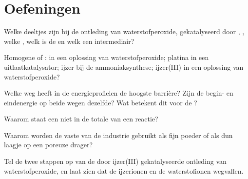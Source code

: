 \section{Oefeningen}


\begin{exercise}[$\star$]\label{exo:g12:catalysis:1}
Welke deeltjes zijn bij de ontleding van waterstofperoxide, gekatalyseerd
door , , welke , welk is de
 en welk een intermediair?
\end{exercise}

\begin{exercise}[$\star$]\label{exo:g12:catalysis:2}
Homogene of :  in een oplossing van
waterstofperoxide; platina in een uitlaatkatalysator; ijzer bij de
ammoniaksynthese; ijzer(III) in een oplossing van waterstofperoxide?
\end{exercise}

\begin{exercise}[$\star$]\label{exo:g12:catalysis:3}
Welke weg heeft in de energieprofielen de hoogste barrière? Zijn de
begin- en eindenergie op beide wegen dezelfde? Wat betekent dit voor de
?
\end{exercise}

\begin{exercise}[$\star$]\label{exo:g12:catalysis:4}
Waarom staat een  niet in de totale  van een
reactie?
\end{exercise}

\begin{exercise}[$\star$]\label{exo:g12:catalysis:5}
Waarom worden de vaste  van de industrie gebruikt als fijn
poeder of als dun laagje op een poreuze drager?
\end{exercise}

\begin{exercise}[$\star\star$]\label{exo:g12:catalysis:6}
Tel de twee stappen op van de door ijzer(III) gekatalyseerde ontleding van
waterstofperoxide, en laat zien dat de ijzerionen en de waterstofionen
wegvallen.
\end{exercise}

